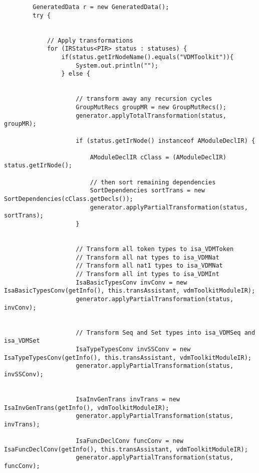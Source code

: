 \begin{appendices}
\begin{lstlisting}
        GeneratedData r = new GeneratedData();
        try {


            // Apply transformations
            for (IRStatus<PIR> status : statuses) {
                if(status.getIrNodeName().equals("VDMToolkit")){
                    System.out.println("");
                } else {


                    // transform away any recursion cycles
                    GroupMutRecs groupMR = new GroupMutRecs();
                    generator.applyTotalTransformation(status, groupMR);
                    
                    if (status.getIrNode() instanceof AModuleDeclIR) {
                      
                        AModuleDeclIR cClass = (AModuleDeclIR) status.getIrNode();
                        
                        // then sort remaining dependencies
                        SortDependencies sortTrans = new SortDependencies(cClass.getDecls());
                        generator.applyPartialTransformation(status, sortTrans);
                    }
                    
                    
                    // Transform all token types to isa_VDMToken
                    // Transform all nat types to isa_VDMNat
                    // Transform all nat1 types to isa_VDMNat
                    // Transform all int types to isa_VDMInt
                    IsaBasicTypesConv invConv = new IsaBasicTypesConv(getInfo(), this.transAssistant, vdmToolkitModuleIR);
                    generator.applyPartialTransformation(status, invConv);
                    
                    
                    // Transform Seq and Set types into isa_VDMSeq and isa_VDMSet
                    IsaTypeTypesConv invSSConv = new IsaTypeTypesConv(getInfo(), this.transAssistant, vdmToolkitModuleIR);
                    generator.applyPartialTransformation(status, invSSConv);
                    
                    
                    IsaInvGenTrans invTrans = new IsaInvGenTrans(getInfo(), vdmToolkitModuleIR);
                    generator.applyPartialTransformation(status, invTrans);
                    
                    IsaFuncDeclConv funcConv = new IsaFuncDeclConv(getInfo(), this.transAssistant, vdmToolkitModuleIR);
                    generator.applyPartialTransformation(status, funcConv);
                    

\end{lstlisting}
\end{appendices}
